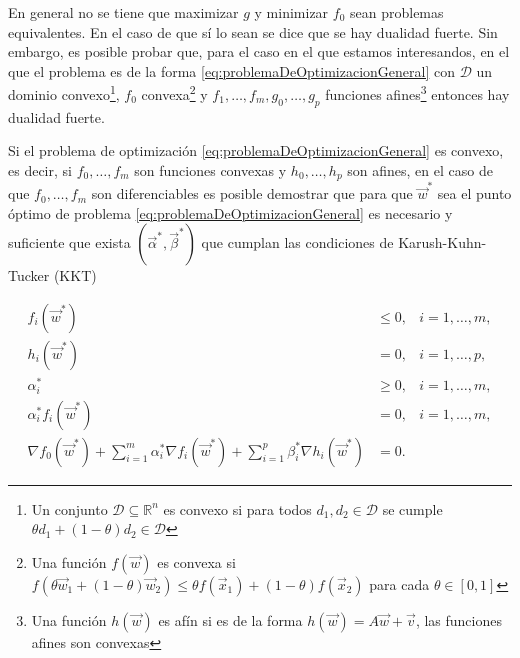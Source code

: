 \documentclass[letterpaper,12pt]{book}
\begin{document}
En general no se tiene que maximizar $g$ y minimizar $f_0$ sean problemas equivalentes. En el caso de que sí lo sean se dice que se hay dualidad fuerte. Sin embargo, es posible probar que, para el caso en el que estamos interesandos, en el que el problema es de la forma \ref{eq:problemaDeOptimizacionGeneral} con $\mathcal{D}$ un dominio convexo\footnote{Un conjunto $\mathcal{D} \subseteq \mathbb{R}^n$ es convexo si para todos $d_1, d_2\in\mathcal{D}$ se cumple $\theta d_1+(1-\theta)d_2\in\mathcal{D}$}, $f_0$ convexa\footnote{Una función $f(\vec{w})$ es convexa si $f(\theta\vec{w}_{1}+(1-\theta)\vec{w}_{2})\leq \theta f(\vec{x}_{1})+(1-\theta)f(\vec{x}_{2})$ para cada $\theta\in[0,1]$} y $f_1,\dots,f_m,g_0,\dots,g_p$ funciones afines\footnote{Una función $h(\vec{w})$ es afín si es de la forma $h(\vec{w}) = A\vec{w}+\vec{v}$, las funciones afines son convexas} entonces hay dualidad fuerte.

Si el problema de optimización \ref{eq:problemaDeOptimizacionGeneral} es convexo, es decir, si $f_0,\dots, f_m$ son funciones convexas y $h_0,\dots,h_p$ son afines, en el caso de que $f_0,\dots, f_m$ son diferenciables es posible demostrar que para que $\vec{w}^*$ sea el punto óptimo de problema \ref{eq:problemaDeOptimizacionGeneral} es necesario y suficiente que exista $(\vec{\alpha}^*,\vec{\beta}^*)$ que cumplan las condiciones de Karush-Kuhn-Tucker (KKT)

\begin{align}
    f_i(\vec{w}^*) &\leq 0, & i=1,\dots,m, \\
    h_i(\vec{w}^*) &= 0, & i=1,\dots,p, \\
    \alpha_i^* &\geq 0, & i=1,\dots,m, \\
    \alpha_i^*f_i(\vec{w}^*) & = 0, & i=1,\dots,m, \label{eq:condicionComplementariedad}\\
    \nabla f_0(\vec{w}^*) + \sum_{i=1}^{m}\alpha_i^*\nabla f_i(\vec{w}^*) + \sum_{i=1}^{p}\beta_i^*\nabla h_i(\vec{w}^*) & = 0. &
\end{align}
\end{document}
